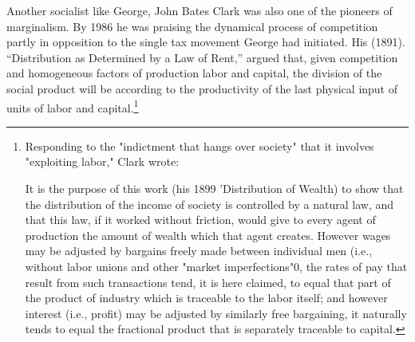   
  Another socialist like George, John Bates Clark was also one of the pioneers of marginalism. By 1986 he was praising the dynamical process of competition partly in opposition to the single tax movement George had initiated.  His (1891). ``Distribution as Determined by a Law of Rent,'' argued that, given  competition and homogeneous factors of production labor and capital, the division of the social product will be according to the productivity of the last physical input of units of labor and capital.\footnote{Responding to the "indictment that hangs over society" that it involves "exploiting labor," Clark wrote:

    It is the purpose of this work (his 1899 'Distribution of Wealth) to show that the distribution of the income of society is controlled by a natural law, and that this law, if it worked without friction, would give to every agent of production the amount of wealth which that agent creates. However wages may be adjusted by bargains freely made between individual men (i.e., without labor unions and other "market imperfections"0, the rates of pay that result from such transactions tend, it is here claimed, to equal that part of the product of industry which is traceable to the labor itself; and however interest (i.e., profit) may be adjusted by similarly free bargaining, it naturally tends to equal the fractional product that is separately traceable to capital.} 
 






